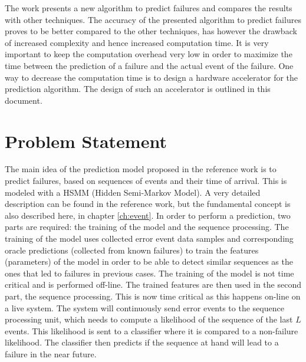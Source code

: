 \documentclass[mscthesis]{usiinfthesis}
\begin{document}
The work presents a new algorithm to predict failures and compares the results
with other techniques. The accuracy of the presented algorithm to predict
failures proves to be better compared to the other techniques, has however the
drawback of increased complexity and hence increased computation time. It is
very important to keep the computation overhead very low in order to maximize
the time between the prediction of a failure and the actual event of the
failure. One way to decrease the computation time is to design a hardware
accelerator for the prediction algorithm. The design of such an accelerator is
outlined in this document.

\section{Problem Statement}
\label{ch:_intro_prob}

The main idea of the prediction model proposed in the reference work
\cite{salfner08} is to predict failures, based on sequences of events and their
time of arrival. This is modeled with a HSMM (Hidden Semi-Markov Model). A very
detailed description can be found in the reference work, but the fundamental
concept is also described here, in chapter \ref{ch:event}. In order to perform
a prediction, two parts are required: the training of the model and the
sequence processing. The training of the model uses collected error event data
samples and corresponding oracle predictions (collected from known failures) to
train the features (parameters) of the model in order to be able to detect
similar sequences as the ones that led to failures in previous cases. The
training of the model is not time critical and is performed off-line. The
trained features are then used in the second part, the sequence processing.
This is now time critical as this happens on-line on a live system. The system
will continuously send error events to the sequence processing unit, which
needs to compute a likelihood of the sequence of the last $L$ events. This
likelihood is sent to a classifier where it is compared to a non-failure
likelihood. The classifier then predicts if the sequence at hand will lead to
a failure in the near future.
\end{document}
